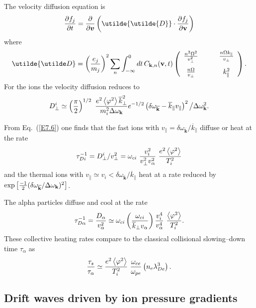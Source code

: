 \documentclass[a4paper,openany,12pt]{book}
\begin{document}
The velocity diffusion equation is
%
\begin{equation}
{\partial f_j\over\partial t}={\partial\over\partial\bm{v}}\left(\utilde{\utilde{D}}\cdot{\partial f_j\over\partial\mathbf{v}}\right)\label{E7.6}
\end{equation}
where
\begin{equation}
\utilde{\utilde D}=\left({e_j\over m_j}\right)^2\sum_n\int_{-\infty}^0 dt\, C_{\mathbf{k}, n}(\mathbf{v}, t)\left(\begin{array}{cc} {n^2\Omega^2\over v^2_\perp}  &\qquad{n\Omega k_\|\over v_\perp}\\[10pt]
{n\Omega\over v_\perp}  &\qquad k^2_\|\end{array}\right).\label{E7.7}
\end{equation}
For the ions the velocity diffusion reduces to 
\begin{equation}
D^i_\perp\simeq\left({\pi\over 2}\right)^{1/2}\ {e^2\left<\varphi^2\right>\overline k^2_\perp\over m_i^2\Delta\omega_{\mathbf k}} 
e^{-1/2}\left(\delta\omega_{\overline{\mathbf k}}-\overline k_\| v_\|\right)^2\big/\Delta\omega^2_{\mathbf{k}}.\label{E7.8}
\end{equation}

From Eq.~(\ref{E7.6}) one finds that the fast ions with $v_\|=\delta\omega_{\overline{\mathbf{k}}}/\overline k_\|$ diffuse or heat at the rate
$$\tau^{-1}_{Di}=D^i_\perp/v^2_\perp=\omega_{ci}\ {v^2_i\over v^2_\perp v^2_\alpha}\ {e^2\left<\varphi^2\right>\over T^2_i}$$
and the thermal ions with $v_\|\simeq v_i<\delta\omega_{\overline{\mathbf{k}}}/\overline k_\|$ heat at a rate reduced by $\exp\left[{-1\over 2} (\delta\omega_{\overline{\mathbf{k}}}/\Delta\omega_{\mathbf{k}})^2\right]$.

The alpha particles diffuse and cool at the rate
$$\tau^{-1}_{D\alpha}={D_\alpha\over v^2_\alpha}\simeq\omega_{ci}\left({\omega_{ci}\over\overline k_\perp v_\alpha}\right) {v^4_i\over v^4_\alpha}\ {\left<\varphi^2\right>\over T^2_i}.$$
These collective heating rates compare to the classical collisional slowing--down time $\tau_\alpha$ as
\begin{equation}
{\tau_s\over\tau_\alpha}\simeq{e^2\left<\varphi^2\right>\over T^2_i}\ {\omega_{ce}\over\omega_{pe}}\left(n_e\lambda^3_{De}\right).\label{E7.9}
\end{equation}
%
\subsection{Drift waves driven by ion pressure gradients}
\end{document}
